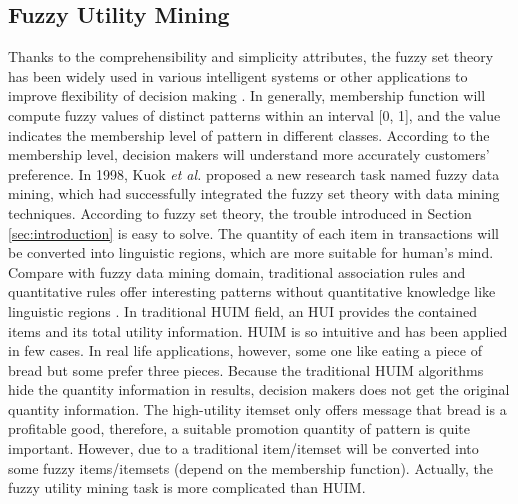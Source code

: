 \documentclass[journal]{IEEEtran}
\begin{document}
\subsection{Fuzzy Utility Mining}

Thanks to the comprehensibility and simplicity attributes, the fuzzy set theory \cite{zadeh1965fuzzy} has been widely used in various intelligent systems or other applications to improve flexibility of decision making \cite{lin2010linguistic}. In generally, membership function will compute fuzzy values of distinct patterns within an interval [0, 1], and the value indicates the membership level of pattern in different classes. According to the membership level, decision makers will understand more accurately customers' preference. In 1998, Kuok \textit{et al.} \cite{kuok1998mining} proposed a new research task named fuzzy data mining, which had successfully integrated the fuzzy set theory with data mining techniques. According to fuzzy set theory, the trouble introduced in Section \ref{sec:introduction} is easy to solve. The quantity of each item in transactions will be converted into linguistic regions, which are more suitable for human's mind. Compare with fuzzy data mining domain, traditional association rules \cite{agrawal1994fast} and quantitative rules \cite{chan1997mining, hong1999mining} offer interesting patterns without quantitative knowledge like linguistic regions \cite{hong2016survey}. In traditional HUIM field, an HUI provides the contained items and its total utility information. HUIM is so intuitive and has been applied in few cases. In real life applications, however, some one like eating a piece of bread but some prefer three pieces. Because the traditional HUIM algorithms hide the quantity information in results, decision makers does not get the original quantity information. The high-utility itemset only offers message that bread is a profitable good, therefore, a suitable promotion quantity of pattern is quite important. However, due to a traditional item/itemset will be converted into some fuzzy items/itemsets (depend on the membership function). Actually, the fuzzy utility mining task is more complicated than HUIM.
\end{document}
